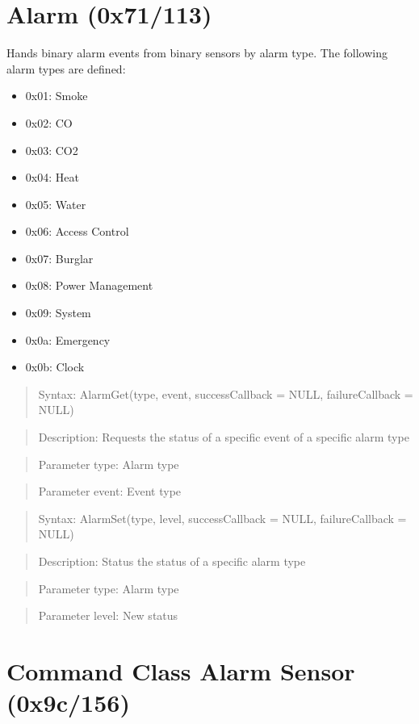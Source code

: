  	  			 	 			 
	

\section{Alarm (0x71/113)}		

Hands binary alarm events from binary sensors by alarm type. The following alarm types
are defined:
\begin{itemize}
\item 0x01: Smoke
\item 0x02: CO
\item 0x03: CO2
\item 0x04: Heat
\item 0x05: Water
\item 0x06: Access Control
\item 0x07: Burglar
\item 0x08: Power Management
\item 0x09: System
\item 0x0a: Emergency
\item 0x0b: Clock
\end{itemize}


\begin{quote} Syntax: AlarmGet(type, event, successCallback = NULL, failureCallback = NULL)\end{quote}
\begin{quote} Description: Requests the status of a specific event of a specific alarm type\end{quote}
\begin{quote} Parameter type: Alarm type\end{quote}
\begin{quote} Parameter event: Event type\end{quote}

\begin{quote} Syntax: AlarmSet(type, level, successCallback = NULL, failureCallback = NULL)\end{quote}
\begin{quote} Description: Status the status of a specific alarm type\end{quote}
\begin{quote} Parameter type: Alarm type\end{quote}
\begin{quote} Parameter level: New status\end{quote}	


\section{Command Class Alarm Sensor (0x9c/156)}


